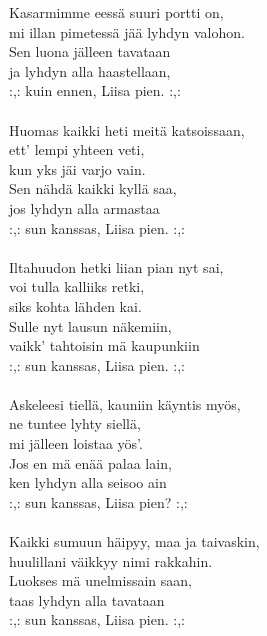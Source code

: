 
            Kasarmimme eessä suuri portti on, \\
            mi illan pimetessä jää lyhdyn valohon. \\
            Sen luona jälleen tavataan \\
            ja lyhdyn alla haastellaan,  \\
            :,: kuin ennen, Liisa pien. :,: \\
\hspace{10mm} \\
            Huomas kaikki heti meitä katsoissaan,  \\
            ett' lempi yhteen veti,  \\
            kun yks jäi varjo vain.  \\
            Sen nähdä kaikki kyllä saa, \\
            jos lyhdyn alla armastaa  \\
            :,: sun kanssas, Liisa pien. :,: \\
\hspace{10mm} \\
            Iltahuudon hetki liian pian nyt sai,  \\
            voi tulla kalliiks retki,  \\
            siks kohta lähden kai.  \\
            Sulle nyt lausun näkemiin,  \\
            vaikk' tahtoisin mä kaupunkiin  \\
            :,: sun kanssas, Liisa pien. :,: \\
\hspace{10mm} \\
            Askeleesi tiellä, kauniin käyntis myös,  \\
            ne tuntee lyhty siellä,  \\
            mi jälleen loistaa yös'. \\
            Jos en mä enää palaa lain,  \\
            ken lyhdyn alla seisoo ain  \\
            :,: sun kanssas, Liisa pien? :,: \\
\hspace{10mm} \\
            Kaikki sumuun häipyy, maa ja taivaskin,  \\
            huulillani väikkyy nimi rakkahin. \\
            Luokses mä unelmissain saan, \\
            taas lyhdyn alla tavataan  \\
            :,: sun kanssas, Liisa pien. :,: \\
